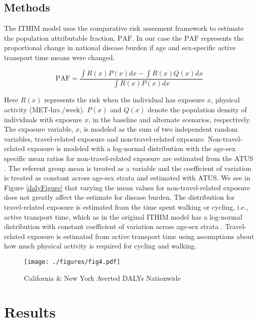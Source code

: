 \documentclass{bioinfo}
\newcommand{\af}{\textrm{PAF}}
\newcommand{\mets}{MET-hrs./week}
\newcommand{\logNormal}{log-normal}
\begin{document}
\begin{methods}

\section{Methods}

The ITHIM model uses the comparative risk assesment framework to
estimate the population attributable fraction, $\af$.  In our case the
$\af$ represents the proportional change in national disease burden if
age and sex-specific active transport time means were changed.

\begin{equation}
\af = \frac{\int R(x)P(x) dx  - \int R(x)Q(x) dx }{\int R(x)P(x) dx}
\end{equation}

Here $R(x)$ represents the risk when the individual has exposure $x$,
physical activity (\mets).  $P(x)$ and $Q(x)$ denote the population
density of individuals with exposure $x$, in the baseline and
alternate scenarios, respectively.  The exposure variable, $x$, is
modeled as the sum of two independent random variables, travel-related
exposure and non-travel-related exposure.  Non-travel-related exposure
is modeled with a \logNormal{} distribution with the age-sex specific
mean ratios for non-travel-related exposure are estimated from the
ATUS \cite{ATUS}.  The referent group mean is treated as a variable
and the coefficient of variation is treated as constant across age-sex
strata and estimated with ATUS.  We see in Figure \ref{dalyFigure}
that varying the mean values for non-travel-related exposure does not
greatly affect the estimate for disease burden.  The distribution for
travel-related exposure is estimated from the time spent walking or
cycling, i.e., active transport time, which as in the original ITHIM
model has a \logNormal{} distribution with constant coefficient of
variation across age-sex strata \cite{}.  Travel-related exposure
is estimated from active transport time using assumptions about how
much physical activity is required for cycling and walking.

\end{methods}

\begin{figure}[t]
  \centerline{\texttt{[image: ./figures/fig4.pdf]}}
    \caption{California \& New York Averted DALYs Nationwide}\label{California}
\end{figure}

\section{Results}
\end{document}
